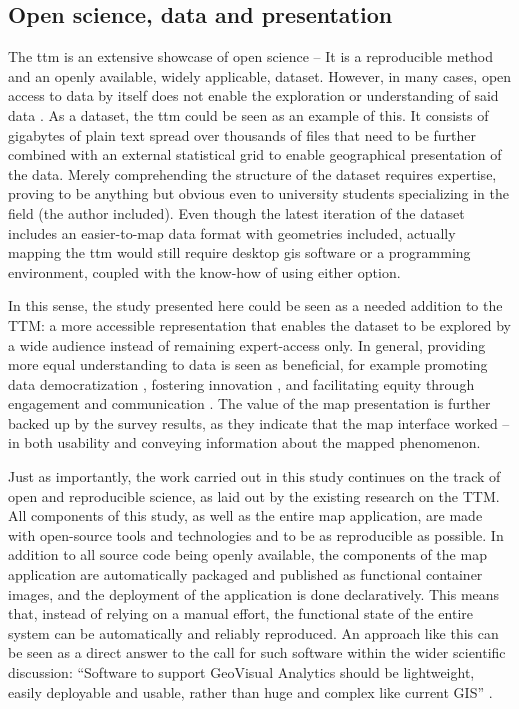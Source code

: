 \subsection{Open science, data and presentation}
The \acrshort{ttm} is an extensive showcase of open science --
It is a reproducible method and an openly available, widely applicable, dataset.
However, in many cases, open access to data by itself does not enable
the exploration or understanding of said data \parencite{obr2016}.
As a dataset, the \acrshort{ttm} could be seen as an example of this.
It consists of gigabytes of plain text spread over thousands of files
that need to be further combined with an external statistical grid to enable
geographical presentation of the data.
Merely comprehending the structure of the dataset requires expertise,
proving to be anything but obvious even to university students specializing in the field
(the author included).
Even though the latest iteration of the dataset \parencite{fin2023}
includes an easier-to-map data format with geometries included,
actually mapping the \acrshort{ttm} would still require
desktop \acrshort{gis} software or a programming environment,
coupled with the know-how of using either option.

In this sense, the study presented here could be seen as a needed addition to the TTM:
a more accessible representation that enables the dataset to be explored by a wide audience
instead of remaining expert-access only.
In general, providing more equal understanding to data is seen as beneficial,
for example promoting data democratization \parencite{awa2020},
fostering innovation \parencite{man2011},
and facilitating equity through engagement and communication \parencite{kra2021}.
The value of the map presentation is further backed up by the survey results,
as they indicate that the map interface worked --
in both usability and conveying information about the mapped phenomenon.

Just as importantly,
the work carried out in this study continues on the track of open and reproducible science,
as laid out by the existing research on the TTM.
All components of this study, as well as the entire map application, are made
with open-source tools and technologies and to be as reproducible as possible.
In addition to all source code being openly available,
the components of the map application are
automatically packaged and published as functional container images,
and the deployment of the application is done declaratively.
This means that, instead of relying on a manual effort,
the functional state of the entire system can be automatically and reliably reproduced.
An approach like this can be seen as a direct answer to the call for such software
within the wider scientific discussion:
\enquote{Software to support GeoVisual Analytics should be lightweight,
easily deployable and usable, rather than huge and complex like current GIS}
\parencite[p.~1596]{and2010}.


